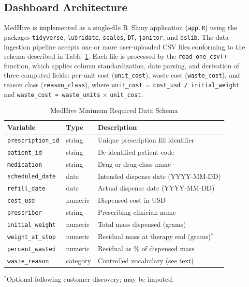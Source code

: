 \documentclass[letterpaper, 10pt, conference]{IEEEconf}
\begin{document}
\subsection{Dashboard Architecture}

MedHive is implemented as a single-file R~Shiny application (\texttt{app.R})
using the packages \texttt{tidyverse}, \texttt{lubridate}, \texttt{scales},
\texttt{DT}, \texttt{janitor}, and \texttt{bslib}.
The data ingestion pipeline accepts one or more user-uploaded CSV files
conforming to the schema described in Table~\ref{table:schema}.
Each file is processed by the \texttt{read\_one\_csv()} function, which
applies column standardization, date parsing, and derivation of three
computed fields: per-unit cost (\texttt{unit\_cost}),
waste cost (\texttt{waste\_cost}), and reason class (\texttt{reason\_class}),
where \texttt{unit\_cost = cost\_usd / initial\_weight} and
\texttt{waste\_cost = waste\_units} $\times$ \texttt{unit\_cost}.

\begin{table}[h]
\caption{MedHive Minimum Required Data Schema}
\label{table:schema}
\begin{center}
\footnotesize
\begin{tabularx}{\columnwidth}{|p{2.7cm}|p{1.2cm}|X|}
\hline
\textbf{Variable} & \textbf{Type} & \textbf{Description} \\
\hline
\texttt{prescription\_id} & string & Unique prescription fill identifier \\
\hline
\texttt{patient\_id} & string & De-identified patient code \\
\hline
\texttt{medication} & string & Drug or drug class name \\
\hline
\texttt{scheduled\_date} & date & Intended dispense date (YYYY-MM-DD) \\
\hline
\texttt{refill\_date} & date & Actual dispense date (YYYY-MM-DD) \\
\hline
\texttt{cost\_usd} & numeric & Dispensed cost in USD \\
\hline
\texttt{prescriber} & string & Prescribing clinician name \\
\hline
\texttt{initial\_weight} & numeric & Total mass dispensed (grams) \\
\hline
\texttt{weight\_at\_stop} & numeric & Residual mass at therapy end (grams)$^{*}$ \\
\hline
\texttt{percent\_wasted} & numeric & Residual as \% of dispensed mass \\
\hline
\texttt{waste\_reason} & category & Controlled vocabulary (see text) \\
\hline
\end{tabularx}
\end{center}
\small{$^{*}$Optional following customer discovery; may be imputed.}
\end{table}
\end{document}
